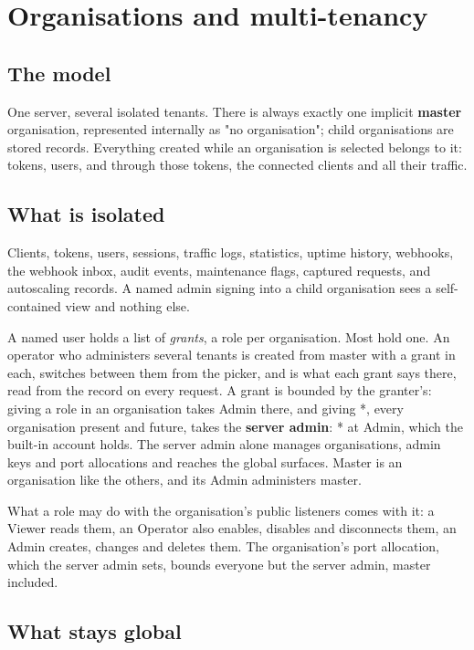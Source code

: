 \documentclass[11pt,a4paper,oneside]{book}
\newcommand{\aperiobreakableunderscore}{\textunderscore\allowbreak}
\newcommand{\aperiocodebreaks}{\XeTeXinterchartokenstate=1 }
\newcommand{\aperiocodebreaks}{}
\DeclareRobustCommand{\code}[1]{{\ttfamily\small\aperiocodebreaks
  \let\_\aperiobreakableunderscore#1}}
\begin{document}
\chapter{Organisations and multi-tenancy}
\label{ch:organizations}

\section{The model}

One server, several isolated tenants. There is always exactly one implicit
\textbf{master} organisation, represented internally as "no organisation";
child organisations are stored records. Everything created while an
organisation is selected belongs to it: tokens, users, and through those
tokens, the connected clients and all their traffic.

\section{What is isolated}

Clients, tokens, users, sessions, traffic logs, statistics, uptime
history, webhooks, the webhook inbox, audit events, maintenance flags,
captured requests, and autoscaling records. A named admin signing into a
child organisation sees a self-contained view and nothing else.

A named user holds a list of \emph{grants}, a role per organisation. Most
hold one. An operator who administers several tenants is created from
master with a grant in each, switches between them from the picker, and
is what each grant says there, read from the record on every request. A
grant is bounded by the granter's: giving a role in an organisation takes
Admin there, and giving \code{*}, every organisation present and future,
takes the \textbf{server admin}: \code{*} at Admin, which the built-in
account holds. The server admin alone manages organisations, admin keys
and port allocations and reaches the global surfaces. Master is an
organisation like the others, and its Admin administers master.

What a role may do with the organisation's public listeners comes with it:
a Viewer reads them, an Operator also enables, disables and disconnects
them, an Admin creates, changes and deletes them. The organisation's port
allocation, which the server admin sets, bounds everyone but the server
admin, master included.

\section{What stays global}
\end{document}

